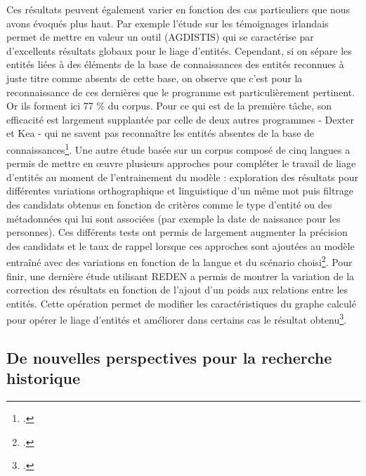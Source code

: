 \documentclass[a4paper,12pt,twoside]{book}
\begin{document}
	Ces résultats peuvent également varier en fonction des cas particuliers que nous avons évoqués plus haut. Par exemple l'étude sur les témoignages irlandais permet de mettre en valeur un outil (AGDISTIS) qui se caractérise par d'excellents résultats globaux pour le liage d'entités. Cependant, si on sépare les entités liées à des éléments de la base de connaissances des entités reconnues à juste titre comme absents de cette base, on observe que c'est pour la reconnaissance de ces dernières que le programme est particulièrement pertinent. Or ils forment ici 77 \% du corpus. Pour ce qui est de la première tâche, son efficacité est largement supplantée par celle de deux autres programmes - Dexter et Kea - qui ne savent pas reconnaître les entités absentes de la base de connaissances\footcite{munnelly_investigating_2018}. Une autre étude basée sur un corpus composé de cinq langues a permis de mettre en œuvre plusieurs approches pour compléter le travail de liage d'entités au moment de l'entrainement du modèle : exploration des résultats pour différentes variations orthographique et linguistique d'un même mot puis filtrage des candidats obtenus en fonction de critères comme le type d'entité ou des métadonnées qui lui sont associées (par exemple la date de naissance pour les personnes). Ces différents tests ont permis de largement augmenter la précision des candidats et le taux de rappel lorsque ces approches sont ajoutées au modèle entraîné avec des variations en fonction de la langue et du scénario choisi\footcite{linhares_pontes_entity_2020}. Pour finir, une dernière étude utilisant REDEN a permis de montrer la variation de la correction des résultats en fonction de l'ajout d'un poids aux relations entre les entités. Cette opération permet de modifier les caractéristiques du graphe calculé pour opérer le liage d'entités et améliorer dans certains cas le résultat obtenu\footcite{morzy_disambiguation_2015}.
	
	\subsection{De nouvelles perspectives pour la recherche historique}
	
\end{document}
